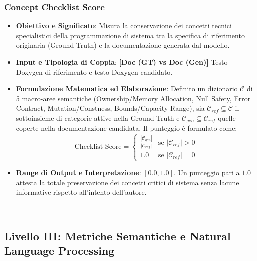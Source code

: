 \subsubsection{Concept Checklist Score}
\label{subsubsec:concept_checklist}
\begin{itemize}[leftmargin=*, label=\textbullet]
    \item \textbf{Obiettivo e Significato}: Misura la conservazione dei concetti tecnici specialistici della programmazione di sistema tra la specifica di riferimento originaria (Ground Truth) e la documentazione generata dal modello.
    \item \textbf{Input e Tipologia di Coppia}: \textbf{[Doc (GT) vs Doc (Gen)]} Testo Doxygen di riferimento e testo Doxygen candidato.
    \item \textbf{Formulazione Matematica ed Elaborazione}: Definito un dizionario $\mathcal{C}$ di 5 macro-aree semantiche (Ownership/Memory Allocation, Null Safety, Error Contract, Mutation/Constness, Bounds/Capacity Range), sia $\mathcal{C}_{ref} \subseteq \mathcal{C}$ il sottoinsieme di categorie attive nella Ground Truth e $\mathcal{C}_{gen} \subseteq \mathcal{C}_{ref}$ quelle coperte nella documentazione candidata. Il punteggio è formulato come:
    \begin{equation}
        \text{Checklist Score} = \begin{cases}
            \frac{|\mathcal{C}_{gen}|}{|\mathcal{C}_{ref}|} & \text{se } |\mathcal{C}_{ref}| > 0 \\
            1.0 & \text{se } |\mathcal{C}_{ref}| = 0
        \end{cases}
        \label{eq:checklist_score}
    \end{equation}
    \item \textbf{Range di Output e Interpretazione}: $[0.0, 1.0]$. Un punteggio pari a $1.0$ attesta la totale preservazione dei concetti critici di sistema senza lacune informative rispetto all'intento dell'autore.
\end{itemize}

---

\subsection{Livello III: Metriche Semantiche e Natural Language Processing}

